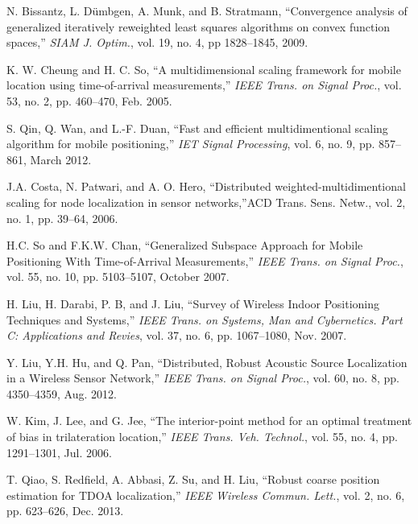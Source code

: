 \begin{thebibliography}{99}
N. Bissantz, L. D\"umbgen, A. Munk, and B.  Stratmann, ``Convergence analysis of generalized iteratively reweighted least squares algorithms on convex function spaces,'' {\em SIAM J. Optim.}, vol. 19, no. 4, pp 1828--1845, 2009.



K. W. Cheung and H. C. So, ``A multidimensional scaling framework for mobile location using time-of-arrival measurements,'' {\em IEEE Trans. on Signal Proc.}, vol. 53, no. 2, pp. 460--470, Feb. 2005.

S. Qin, Q. Wan, and L.-F. Duan, ``Fast and efficient multidimentional scaling algorithm for mobile positioning,'' {\em IET Signal Processing}, vol. 6, no. 9, pp. 857--861, March 2012.

J.A. Costa, N. Patwari, and A. O. Hero, ``Distributed weighted-multidimentional scaling for node localization in sensor networks,''ACD Trans. Sens. Netw., vol. 2, no. 1, pp. 39--64, 2006. 

H.C. So and F.K.W. Chan, ``Generalized Subspace Approach for Mobile Positioning With Time-of-Arrival Measurements,'' {\em IEEE Trans. on Signal Proc.}, vol. 55, no. 10, pp. 5103--5107, October 2007.

H. Liu, H. Darabi, P. B, and J. Liu, ``Survey of Wireless Indoor Positioning Techniques and Systems,'' {\em IEEE Trans. on Systems, Man and Cybernetics. Part C: Applications and Revies}, vol. 37, no. 6, pp. 1067--1080, Nov. 2007.

Y. Liu, Y.H. Hu, and Q. Pan, ``Distributed, Robust Acoustic Source Localization in a Wireless Sensor Network,'' {\em IEEE Trans. on Signal Proc.}, vol. 60, no. 8, pp. 4350--4359, Aug. 2012.

W. Kim, J. Lee, and G. Jee, ``The interior-point method for an optimal treatment of bias in trilateration location,'' {\em IEEE Trans. Veh. Technol.}, vol. 55, no. 4, pp. 1291--1301, Jul. 2006.

T. Qiao, S. Redfield, A. Abbasi, Z. Su, and H. Liu, ``Robust coarse position estimation for TDOA localization,'' {\em IEEE Wireless Commun. Lett.}, vol. 2, no. 6, pp. 623--626, Dec. 2013.


\end{thebibliography}
